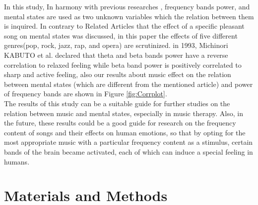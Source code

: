 \documentclass[9pt,twocolumn]{paper-template}
\begin{document}
In this study, In harmony with previous researches \cite{kabuto1993,Wagner1975}, frequency bands power, and mental states are used as two unknown variables which the relation between them is inquired.  In contrary to Related Articles \cite{kabuto1993,Verrusio2015,Wagner1975} that the effect of a specific pleasant song on mental states was discussed, in this paper the effects of five different genres(pop, rock, jazz, rap, and opera) are scrutinized. in 1993, Michinori KABUTO et al. declared that theta and beta bands power have a reverse correlation to relaxed feeling while beta band power is positively correlated to sharp and active feeling, also our results about music effect on the relation between mental states (which are different from the mentioned article) and power of frequency bands are shown in Figure \ref{fig:Corrplot}.\\

The results of this study can be a suitable guide for further studies on the relation between music and mental states, especially in music therapy. Also, in the future, these results could be a good guide for research on the frequency content of songs and their effects on human emotions, so that by opting for the most appropriate music with a particular frequency content as a stimulus, certain bands of the brain became activated, each of which can induce a special feeling in humans. \\ 






\section*{Materials and Methods}
\end{document}
